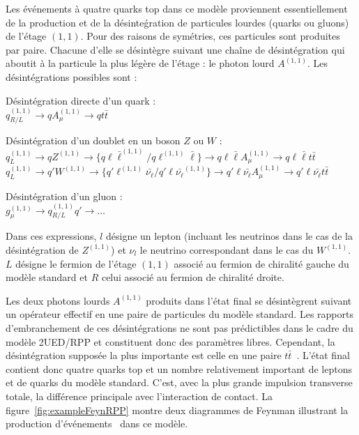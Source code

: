 Les événements à quatre quarks top dans ce modèle proviennent essentiellement de la production et de la d\'esinte\'gration de particules lourdes (quarks ou gluons) de l'\'etage $(1,1)$. Pour des raisons de sym\'etries, ces particules sont produites par paire. Chacune d'elle se d\'esint\`egre suivant une chaîne de désintégration qui aboutit \`a la particule la plus l\'eg\`ere de l'\'etage : le photon lourd $A^{(1,1)}$. Les d\'esint\'egrations possibles sont :
\begin{maliste}
\item D\'esint\'egration directe d'un quark : \\
$q_{R/L}^{(1,1)} \rightarrow q A_\mu^{(1,1)} \rightarrow q t \bar{t}$
\item D\'esint\'egration d'un doublet en un boson $Z$ ou $W$ :\\
$q_L^{(1,1)} \rightarrow q Z^{(1,1)} \rightarrow \{q \ell \bar{\ell}^{(1,1)} / q \ell^{(1,1)} \bar{\ell}\} \rightarrow q \ell \bar{\ell}  A_\mu^{(1,1)} \rightarrow q \ell \bar{\ell} t \bar{t}$\\
$q_L^{(1,1)} \rightarrow q' W^{(1,1)} \rightarrow \{q' \ell^{(1,1)} \bar{\nu_\ell} / q' \ell \bar{\nu_\ell}^{(1,1)}\} \rightarrow q' \ell \bar{\nu_\ell} A_\mu^{(1,1)} \rightarrow q' \ell \bar{\nu_\ell} t \bar{t}$
\item D\'esint\'egration d'un gluon : \\
$g_\mu^{(1,1)} \rightarrow q_{R/L}^{(1,1)} q' \rightarrow \dots$
\end{maliste}

Dans ces expressions, $l$ d\'esigne un lepton (incluant les neutrinos dans le cas de la d\'esint\'egration de $Z^{(1,1)}$) et $\nu_l$ le neutrino correspondant dans le cas du $W^{(1,1)}$. $L$ d\'esigne le fermion de l'\'etage $(1,1)$ associ\'e au fermion de chiralit\'e gauche du mod\`ele standard et $R$ celui associ\'e au fermion de chiralit\'e droite.

Les deux photons lourds $A^{(1,1)}$ produits dans l'\'etat final se d\'esint\`egrent suivant un op\'erateur effectif en une paire de particules du mod\`ele standard. Les rapports d'embranchement de ces d\'esint\'egrations ne sont pas pr\'edictibles dans le cadre du mod\`ele 2UED/RPP et constituent donc des param\`etres libres. Cependant, la d\'esint\'egration suppos\'ee la plus importante est celle en une paire $t\bar{t}$~\cite{Lyon11}. L'\'etat final contient donc quatre quarks top et un nombre relativement important de leptons et de quarks du mod\`ele standard. C'est, avec la plus grande impulsion transverse totale, la différence principale avec l'interaction de contact. La figure~\ref{fig:exampleFeynRPP} montre deux diagrammes de Feynman illustrant la production d'\'ev\'enements \fourtop~dans ce mod\`ele. 

